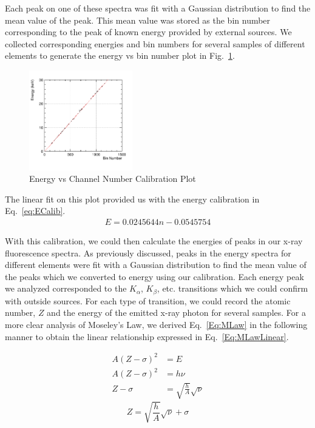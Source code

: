 \documentclass[%
 reprint,
 amsmath,amssymb,
 aps,
 pra,
]{revtex4-1}
\begin{document}
Each peak on one of these spectra was fit with a Gaussian distribution to find the mean value of the peak. This mean value was stored as the bin number corresponding to the peak of known energy provided by external sources. We collected corresponding energies and bin numbers for several samples of different elements to generate the energy vs bin number plot in Fig.~\ref{Fig:Evsbin}.

\begin{figure}[H]
	\centering
	\includegraphics[width=0.4\textwidth]{EvsBin.png}
	\caption{Energy vs Channel Number Calibration Plot}
	\label{Fig:Evsbin}
\end{figure}

The linear fit on this plot provided us with the energy calibration in Eq.~\ref{eq:ECalib}.
\begin{gather}\label{eq:ECalib}
	E = 0.0245644n - 0.0545754
\end{gather}

With this calibration, we could then calculate the energies of peaks in our x-ray fluorescence spectra. As previously discussed, peaks in the energy spectra for different elements were fit with a Gaussian distribution to find the mean value of the peaks which we converted to energy using our calibration. Each energy peak we analyzed corresponded to the $K_{\alpha}$, $K_{\beta}$, etc. transitions which we could confirm with outside sources. For each type of transition, we could record the atomic number, $Z$ and the energy of the emitted x-ray photon for several samples. For a more clear analysis of Moseley's Law, we derived Eq.~\ref{Eq:MLaw} in the following manner to obtain the linear relationship expressed in Eq.~\ref{Eq:MLawLinear}.

\begin{align*}
A(Z - \sigma)^{2} &= E\\
A(Z - \sigma)^{2} &= h \nu\\
Z - \sigma &= \sqrt{\frac{h}{A}}\sqrt{\nu}
\end{align*}
\begin{equation}\label{Eq:MLawLinear}
Z = \sqrt{\frac{h}{A}}\sqrt{\nu} + \sigma
\end{equation}
\end{document}
